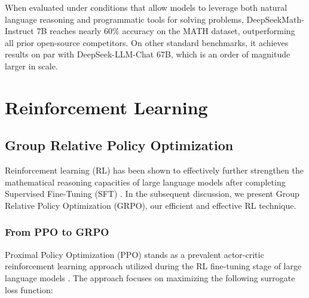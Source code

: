 When evaluated under conditions that allow models to leverage both natural language reasoning and programmatic tools for solving problems, DeepSeekMath-Instruct 7B reaches nearly 60\% accuracy on the MATH dataset, outperforming all prior open-source competitors. On other standard benchmarks, it achieves results on par with DeepSeek-LLM-Chat 67B, which is an order of magnitude larger in scale.

\section{Reinforcement Learning}

\subsection{Group Relative Policy Optimization} 
Reinforcement learning (RL) has been shown to effectively further strengthen the mathematical reasoning capacities of large language models after completing Supervised Fine-Tuning (SFT) \citep{wang2023math, wizardmath}. In the subsequent discussion, we present Group Relative Policy Optimization (GRPO), our efficient and effective RL technique.

\subsubsection{From PPO to GRPO} 
Proximal Policy Optimization (PPO) \citep{schulman2017proximal} stands as a prevalent actor-critic reinforcement learning approach utilized during the RL fine-tuning stage of large language models \citep{ouyang2022training}. The approach focuses on maximizing the following surrogate loss function:


